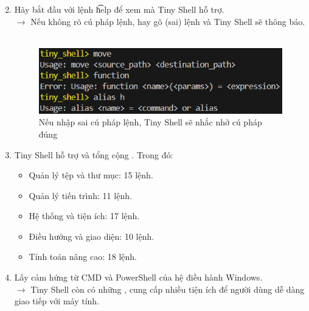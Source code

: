 \begin{frame}
\begin{enumerate}
    \setcounter{enumi}{1}
    \item Hãy bắt đầu với lệnh \t{help} để xem  mà Tiny Shell hỗ trợ.\\
    $\to$ Nếu không rõ cú pháp lệnh, hay gõ (sai) lệnh và Tiny Shell sẽ thông báo.\\
    \vspace{10 pt}
    \\
    \begin{figure}
        \centering
        \includegraphics{images/04.png}
        \caption{Nếu nhập sai cú pháp lệnh, Tiny Shell sẽ nhắc nhở cú pháp đúng}
    \end{figure}
\end{enumerate}
\end{frame}

\begin{frame}
\begin{enumerate}
    \setcounter{enumi}{2}
    \item Tiny Shell hỗ trợ  và tổng cộng . Trong đó:
    \begin{itemize}
        \item Quản lý tệp và thư mục: 15 lệnh.
        \item Quản lý tiến trình: 11 lệnh.
        \item Hệ thống và tiện ích: 17 lệnh.
        \item Điều hướng và giao diện: 10 lệnh.
        \item Tính toán nâng cao: 18 lệnh.
    \end{itemize}
    \item Lấy cảm hứng từ CMD và PowerShell của hệ điều hành Windows.\\
    $\to$ Tiny Shell còn có những , cung cấp nhiều tiện ích để người dùng dễ dàng giao tiếp với máy tính. 
\end{enumerate}
\end{frame}

